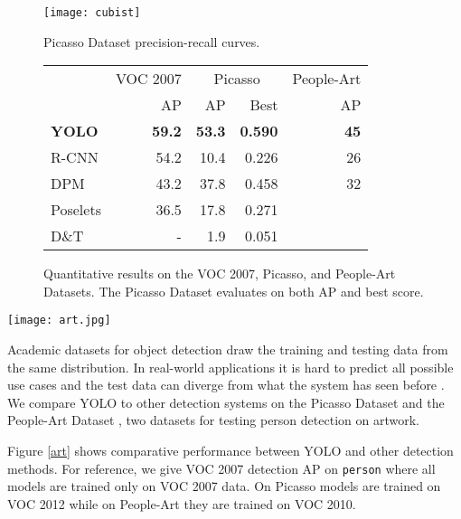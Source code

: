 \documentclass[10pt,twocolumn,letterpaper]{article}
\begin{document}
\begin{figure*}
\centering
\begin{subfigure}[b]{.45\textwidth}
    \centering
    \texttt{[image: cubist]}
    \caption{\small Picasso Dataset precision-recall curves.}
\end{subfigure}\begin{subfigure}[b]{.55\textwidth}
    \centering
    \begin{tabular}{l|r|rr|r}
& VOC 2007 & \multicolumn{2}{c|}{Picasso} & People-Art\\
 & AP & AP & Best  & AP\\
\hline
\textbf{YOLO} & \textbf{59.2} & \textbf{53.3} & \textbf{0.590} & \textbf{45}\\
R-CNN & 54.2 & 10.4 & 0.226 & 26\\
DPM & 43.2 & 37.8 & 0.458 & 32\\
Poselets \cite{BourdevMalikICCV09} & 36.5 & 17.8 & 0.271 \\
D\&T \cite{dalal2005histograms} & - & 1.9 & 0.051 \\
\end{tabular}
\caption{\small Quantitative results on the VOC 2007, Picasso, and People-Art Datasets. The Picasso Dataset evaluates on both AP and best  score.}
\end{subfigure}
\caption{\small \textbf{Generalization results on Picasso and People-Art datasets.}}
\label{art}
\end{figure*}


\begin{figure*}[t]
\begin{center}
    \texttt{[image: art.jpg]}
\end{center}
   \caption{\small \textbf{Qualitative Results.} YOLO running on sample artwork and natural images from the internet. It is mostly accurate although it does think one person is an airplane.}
\label{images}
\end{figure*}

Academic datasets for object detection draw the training and testing data from the same distribution. In real-world applications it is hard to predict all possible use cases and the test data can diverge from what the system has seen before \cite{cai2015cross}. 
We compare YOLO to other detection systems on the Picasso Dataset \cite{ginosar2014detecting} and the People-Art Dataset \cite{cai2015cross}, two datasets for testing person detection on artwork.


Figure \ref{art} shows comparative performance between YOLO and other detection methods. For reference, we give VOC 2007 detection AP on \texttt{person} where all models are trained only on VOC 2007 data. On Picasso models are trained on VOC 2012 while on People-Art they are trained on VOC 2010.
\end{document}
